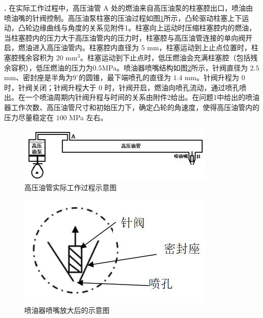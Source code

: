 \documentclass[12pt,a4paper]{article}
\begin{document}
\textbf{.} 在实际工作过程中，高压油管 A 处的燃油来自高压油泵的柱塞腔出口，喷油由喷油嘴的针阀控制。高压油泵柱塞的压油过程如图\ref{gaoyayouguanshijigongzuoguochengshiyitu}所示，凸轮驱动柱塞上下运动，凸轮边缘曲线与角度的关系见附件1。柱塞向上运动时压缩柱塞腔内的燃油，当柱塞腔内的压力大于高压油管内的压力时，柱塞腔与高压油管连接的单向阀开启，燃油进入高压油管内。柱塞腔内直径为 $5$ mm，柱塞运动到上止点位置时，柱塞腔残余容积为 $20$ mm$^3$。柱塞运动到下止点时，低压燃油会充满柱塞腔（包括残余容积），低压燃油的压力为$0.5$MPa。喷油器喷嘴结构如图\ref{penyouqipenzuifangdahoudeshiyitu}所示，针阀直径为 $2.5$ mm、密封座是半角为$9^{\circ}$的圆锥，最下端喷孔的直径为 $1.4$ mm。针阀升程为 $0$ 时，针阀关闭；针阀升程大于 $0$ 时，针阀开启，燃油向喷孔流动，通过喷孔喷出。在一个喷油周期内针阀升程与时间的关系由附件2给出。在问题1中给出的喷油器工作次数、高压油管尺寸和初始压力下，确定凸轮的角速度，使得高压油管内的压力尽量稳定在 $100$ MPa 左右。
\begin{figure}[h]
\centering
\includegraphics[scale=1]{gaoyayouguanshijigongzuoguochengshiyitu.jpg}
\caption{高压油管实际工作过程示意图}\label{gaoyayouguanshijigongzuoguochengshiyitu}
\end{figure}
\begin{figure}[h]
\centering
\includegraphics[scale=1]{penyouqipenzuifangdahoudeshiyitu.jpg}
\caption{喷油器喷嘴放大后的示意图}\label{penyouqipenzuifangdahoudeshiyitu}
\end{figure}
\end{document}

